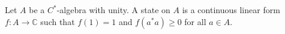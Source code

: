 Let $A$ be a $C^*$-algebra with unity. A state on $A$ is a continuous linear form $f: A \to \mathbb{C}$ such that $f(1) = 1$ and $f(a^*a) \geq 0$ for all $a \in A$.
